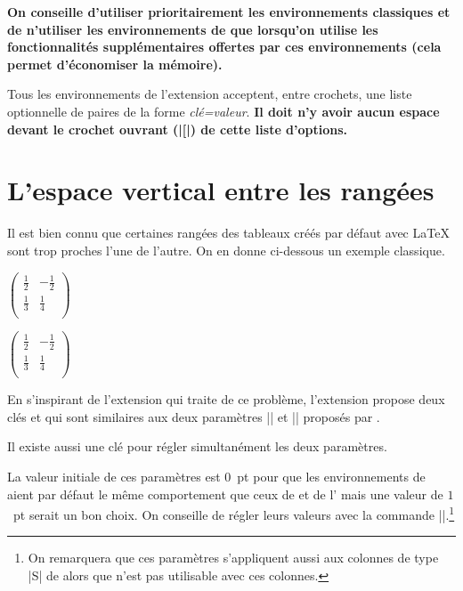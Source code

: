 \documentclass[dvipsnames]{article}%
\begin{document}
\medskip
\textbf{On conseille d'utiliser prioritairement les environnements classiques et de
n'utiliser les environnements de  que lorsqu'on utilise les
fonctionnalités supplémentaires offertes par ces environnements (cela permet
d'économiser la mémoire).}

\medskip
Tous les environnements de l'extension  acceptent, entre
crochets, une liste optionnelle de paires de la forme \textsl{clé=valeur}.
{\bfseries Il doit n'y avoir aucun espace devant le crochet ouvrant (|[|) de
  cette liste d'options.}


\section{L'espace vertical entre les rangées}

\label{cell-space}

Il est bien connu que certaines rangées des tableaux créés par défaut avec
LaTeX sont trop proches l'une de l'autre. On en donne ci-dessous un exemple
classique.

\medskip
\begin{Code}[width=9cm]
$\begin{pmatrix}
\frac{1}{2} & -\frac{1}{2} \\
\frac{1}{3} & \frac{1}{4} \\
\end{pmatrix}$
\end{Code}
$\begin{pmatrix}
\frac{1}{2} & -\frac{1}{2} \\
\frac{1}{3} & \frac{1}{4} \\
\end{pmatrix}$

\medskip
En s'inspirant de l'extension  qui traite de ce problème,
l'extension  propose deux clés 
et  qui sont similaires aux deux paramètres
|\cellspacetoplimit| et |\cellspacebottomlimit| proposés par .

Il existe aussi une clé  pour régler simultanément
les deux paramètres.

La valeur initiale de ces paramètres est $0$~pt pour que les environnements de
 aient par défaut le même comportement que ceux de 
et de l' mais une valeur de $1$~pt serait un bon choix. On
conseille de régler leurs valeurs avec la commande
|\NiceMatrixOptions|.\footnote{On remarquera que ces paramètres s'appliquent
  aussi aux colonnes de type |S| de  alors que 
  n'est pas utilisable avec ces colonnes.}
\end{document}
